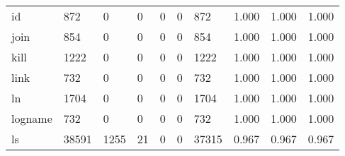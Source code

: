 \begin{longtable}{lp{2.0cm}p{2.0cm}p{2.0cm}p{2.0cm}p{2.0cm}p{2.0cm}p{2.0cm}p{2.0cm}p{2.0cm}}
id        &                    872 &                                  0 &                                 0 &                                0 &                                 0 &                             872 &                                1.000 &                                  1.000 &                                1.000 \\
join      &                    854 &                                  0 &                                 0 &                                0 &                                 0 &                             854 &                                1.000 &                                  1.000 &                                1.000 \\
kill      &                   1222 &                                  0 &                                 0 &                                0 &                                 0 &                            1222 &                                1.000 &                                  1.000 &                                1.000 \\
link      &                    732 &                                  0 &                                 0 &                                0 &                                 0 &                             732 &                                1.000 &                                  1.000 &                                1.000 \\
ln        &                   1704 &                                  0 &                                 0 &                                0 &                                 0 &                            1704 &                                1.000 &                                  1.000 &                                1.000 \\
logname   &                    732 &                                  0 &                                 0 &                                0 &                                 0 &                             732 &                                1.000 &                                  1.000 &                                1.000 \\
ls        &                  38591 &                               1255 &                                21 &                                0 &                                 0 &                           37315 &                                0.967 &                                  0.967 &                                0.967 \\

\end{longtable}

